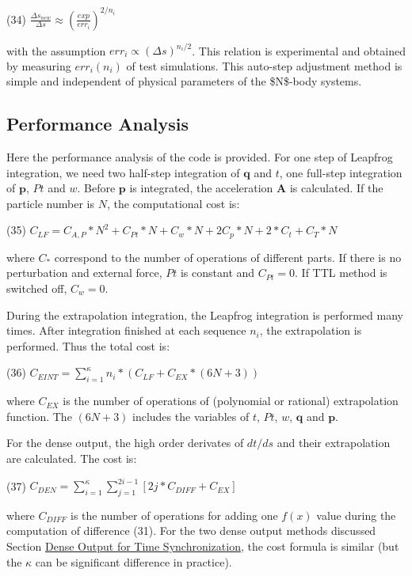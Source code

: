 (34) $ \frac{\Delta s_{new}}{\Delta s} \approx \left(\frac{exp}{err_{i}}\right)^{2/n_i} $

with the assumption $ err_i \propto (\Delta s)^{n_i/2} $. This relation is experimental and obtained by measuring $ err_i(n_i) $ of test simulations. This auto-\/step adjustment method is simple and independent of physical parameters of the \$N\$-\/body systems.\hypertarget{index_perf_sec}{}\subsection{Performance Analysis}\label{index_perf_sec}
Here the performance analysis of the code is provided. For one step of Leapfrog integration, we need two half-\/step integration of $ \mathbf{q} $ and $ t $, one full-\/step integration of $ \mathbf{p} $, $ Pt $ and $ w $. Before $ \mathbf{p} $ is integrated, the acceleration $ \mathbf{A} $ is calculated. If the particle number is $ N $, the computational cost is\+:

(35) $ C_{LF} = C_{A,P}*N^2 + C_{Pt}*N + C_{w}*N + 2C_{p}*N + 2*C_{t} + C_{T}*N $

where $ C_* $ correspond to the number of operations of different parts. If there is no perturbation and external force, $ Pt $ is constant and $ C_{Pt} = 0$. If T\+TL method is switched off, $ C_{w} = 0$.

During the extrapolation integration, the Leapfrog integration is performed many times. After integration finished at each sequence $ n_i $, the extrapolation is performed. Thus the total cost is\+:

(36) $ C_{EINT} = \sum_{i=1}^\kappa n_i*(C_{LF} + C_{EX}*(6N+3))$

where $ C_{EX} $ is the number of operations of (polynomial or rational) extrapolation function. The $ (6N+3) $ includes the variables of $ t $, $ Pt $, $ w $, $ \mathbf{q} $ and $ \mathbf{p} $.

For the dense output, the high order derivates of $ dt/ds $ and their extrapolation are calculated. The cost is\+:

(37) $ C_{DEN} = \sum_{i=1}^\kappa \sum_{j=1}^{2i-1} [2j*C_{DIFF} + C_{EX}] $

where $ C_{DIFF} $ is the number of operations for adding one $ f(x) $ value during the computation of difference (31). For the two dense output methods discussed Section \hyperlink{index_dense_sec}{Dense Output for Time Synchronization}, the cost formula is similar (but the $ \kappa $ can be significant difference in practice).

